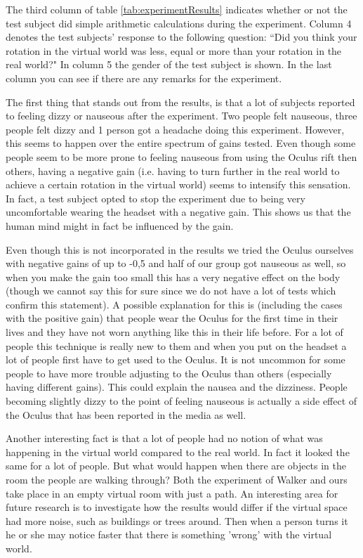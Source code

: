 The third column of table \ref{tab:experimentResults} indicates whether or not the test subject did simple arithmetic calculations during the experiment.
Column 4 denotes the test subjects'  response to the following question: ``Did you think your rotation in the virtual world was less, equal or more than your rotation in the real world?"
In column 5 the gender of the test subject is shown.
In the last column you can see if there are any remarks for the experiment.

The first thing that stands out from the results, is that a lot of subjects reported to feeling dizzy or nauseous after the experiment.
Two people felt nauseous, three people felt dizzy and 1 person got a headache doing this experiment.
However, this seems to happen over the entire spectrum of gains tested.
Even though some people seem to be more prone to feeling nauseous from using the Oculus rift then others, having a negative gain (i.e. having to turn further in the real world to achieve a certain rotation in the virtual world) seems to intensify this sensation.
In fact, a test subject opted to stop the experiment due to being very uncomfortable wearing the headset with a negative gain.
This shows us that the human mind might in fact be influenced by the gain.

Even though this is not incorporated in the results we tried the Oculus ourselves with negative gains of up to -0,5 and half of our group got nauseous as well, so when you make the gain too small this has a very negative effect on the body (though we cannot say this for sure since we do not have a lot of tests which confirm this statement).
A possible explanation for this is (including the cases with the positive gain) that people wear the Oculus for the first time in their lives and they have not worn anything like this in their life before.
For a lot of people this technique is really new to them and when you put on the headset a lot of people first have to get used to the Oculus.
It is not uncommon for some people to have more trouble adjusting to the Oculus than others (especially having different gains).
This could explain the nausea and the dizziness.
People becoming slightly dizzy to the point of feeling nauseous is actually a side effect of the Oculus that has been reported in the media as well.


Another interesting fact is that a lot of people had no notion of what was happening in the virtual world compared to the real world.
In fact it looked the same for a lot of people. But what would happen when there are objects in the room the people are walking through?
Both the experiment of Walker \cite{jwalker} and ours take place in an empty virtual room with just a path.
An interesting area for future research is to investigate how the results would differ if the virtual space had more noise, such as buildings or trees around.
Then when a person turns it he or she may notice faster that there is something 'wrong'  with the virtual world.

